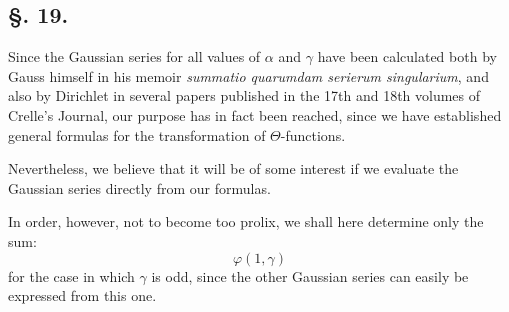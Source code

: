 \documentclass[10pt]{article}
\begin{document}
\subsection*{\S. 19.}
Since the Gaussian series for all values of \(\alpha\) and \(\gamma\) have been calculated both by Gauss himself in his memoir \textit{summatio quarumdam serierum singularium}, and also by Dirichlet in several papers published in the 17th and 18th volumes of Crelle's Journal, our purpose has in fact been reached, since we have established general formulas for the transformation of \(\Theta\)-functions.

Nevertheless, we believe that it will be of some interest if we evaluate the Gaussian series directly from our formulas.

In order, however, not to become too prolix, we shall here determine only the sum:
\[
\varphi(1,\gamma)
\]
for the case in which \(\gamma\) is odd, since the other Gaussian series can easily be expressed from this one.
\end{document}
